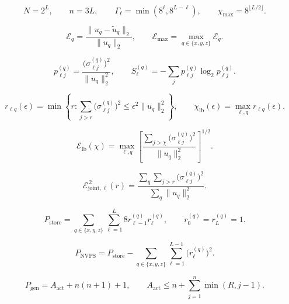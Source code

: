 \begin{equation}
  N=2^L,\qquad n=3L,\qquad
  \Gamma_\ell=\min(8^\ell,8^{L-\ell}),\qquad
  \chi_{\max}=8^{\lfloor L/2\rfloor}.
\end{equation}

\begin{equation}
  \mathcal{E}_q
  =\frac{\|u_q-\widetilde{u}_q\|_2}{\|u_q\|_2},
  \qquad
  \mathcal{E}_{\max}=\max_{q\in\{x,y,z\}}\mathcal{E}_q.
\end{equation}

\begin{equation}
  p_{\ell j}^{(q)}
  =\frac{\bigl(\sigma_{\ell j}^{(q)}\bigr)^2}{\|u_q\|_2^2},
  \qquad
  S_\ell^{(q)}
  =-\sum_j p_{\ell j}^{(q)}\log_2p_{\ell j}^{(q)}.
\end{equation}

\begin{equation}
  r_{\ell q}(\epsilon)
  =\min\left\{r:
    \sum_{j>r}\bigl(\sigma_{\ell j}^{(q)}\bigr)^2
    \leq\epsilon^2\|u_q\|_2^2
  \right\},
  \qquad
  \chi_{\mathrm{lb}}(\epsilon)
  =\max_{\ell,q}r_{\ell q}(\epsilon).
\end{equation}

\begin{equation}
  \mathcal{E}_{\mathrm{lb}}(\chi)
  =\max_{\ell,q}
    \left[
      \frac{\sum_{j>\chi}\bigl(\sigma_{\ell j}^{(q)}\bigr)^2}
           {\|u_q\|_2^2}
    \right]^{1/2}.
\end{equation}

\begin{equation}
  \mathcal{E}_{\mathrm{joint},\ell}^{\,2}(r)
  =\frac{
    \sum_q\sum_{j>r}\bigl(\sigma_{\ell j}^{(q)}\bigr)^2
  }{\sum_q\|u_q\|_2^2}.
\end{equation}

\begin{equation}
  P_{\mathrm{store}}
  =\sum_{q\in\{x,y,z\}}\sum_{\ell=1}^{L}
       8r_{\ell-1}^{(q)}r_\ell^{(q)},
  \qquad r_0^{(q)}=r_L^{(q)}=1.
\end{equation}

\begin{equation}
  P_{\mathrm{NVPS}}
  =P_{\mathrm{store}}
    -\sum_{q\in\{x,y,z\}}\sum_{\ell=1}^{L-1}
       \bigl(r_\ell^{(q)}\bigr)^2.
\end{equation}

\begin{equation}
  P_{\mathrm{gen}}
  =A_{\mathrm{act}}+n(n+1)+1,
  \qquad
  A_{\mathrm{act}}
  \leq n+\sum_{j=1}^{n}\min(R,j-1).
\end{equation}
